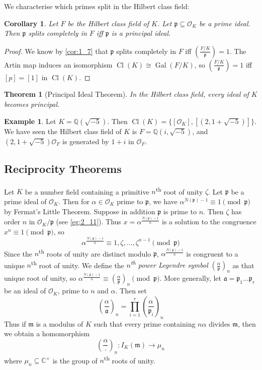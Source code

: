 \documentclass[11pt]{article}
\theoremstyle{definition}
\newtheorem{example}[definition]{Example}
\theoremstyle{plain}
\newtheorem{theorem}[definition]{Theorem}
\newtheorem{corollary}[definition]{Corollary}
\theoremstyle{remark}
\DeclareMathOperator{\Gal}{Gal}
\DeclareMathOperator{\Cl}{Cl}
\newcommand{\QQ}{\mathbb{Q}}
\newcommand{\CC}{\mathbb{C}}
\newcommand{\cO}{\mathcal{O}}
\newcommand{\fa}{\mathfrak{a}}
\newcommand{\fp}{\mathfrak{p}}
\newcommand{\fm}{\mathfrak{m}}
\newcommand{\leg}[2]{\left(\frac{#1}{#2}\right)}
\begin{document}
\noindent We characterise which primes split in the Hilbert class field:

\begin{corollary}\label{cor:4_8}
    Let $F$ be the Hilbert class field of $K$. Let $\fp \subseteq \cO_K$ be a prime ideal. Then $\fp$ splits completely in $F$ iff $\fp$ is a principal ideal.
\end{corollary}
\begin{proof}
    We know by \autoref{cor:1_7} that $\fp$ splits completely in $F$ iff $\leg{F/K}{\fp} = 1$. The Artin map induces an isomorphism $\Cl(K) \cong \Gal(F/K)$, so $\leg{F/K}{\fp} = 1$ iff $[p] = [1]$ in $\Cl(K)$.
\end{proof}

\begin{theorem}[Principal Ideal Theorem]\label{thm:4_9}
    In the Hilbert class field, every ideal of $K$ becomes principal.
\end{theorem}

\begin{example}\label{eg:4_10}
    Let $K = \QQ(\sqrt{-5})$. Then $\Cl(K) = \{[\cO_K], [(2, 1+\sqrt{-5})]\}$. We have seen the Hilbert class field of $K$ is $F = \QQ(i, \sqrt{-5})$, and $(2, 1+\sqrt{-5}) \cO_F$ is generated by $1+i$ in $\cO_F$.
\end{example}

\subsection{Reciprocity Theorems}

Let $K$ be a number field containing a primitive $n$\textsuperscript{th} root of unity $\zeta$. Let $\fp$ be a prime ideal of $\cO_K$. Then for $\alpha \in \cO_K$ prime to $\fp$, we have $\alpha^{N(\fp) - 1} \equiv 1 \pmod{\fp}$ by Fermat's Little Theorem. Suppose in addition $\fp$ is prime to $n$. Then $\zeta$ has order $n$ in $\cO_K / \fp$ (see \autoref{eg:2_11}). Thus $x = \alpha^{\frac{N(\fp)-1}{n}}$ is a solution to the congruence $x^n \equiv 1 \pmod{\fp}$, so
\begin{equation*}
    \alpha^{\frac{N(\fp)-1}{n}} \equiv 1, \zeta, \ldots, \zeta^{n-1} \pmod{\fp}
\end{equation*}
Since the $n$\textsuperscript{th} roots of unity are distinct modulo $\fp$, $\alpha^{\frac{N(\fp)-1}{n}}$ is congruent to a unique $n$\textsuperscript{th} root of unity. We define the \emph{$n$\textsuperscript{th} power Legendre symbol} $\leg{\alpha}{\fp}_n$ as that unique root of unity, so $\alpha^{\frac{N(\fp)-1}{n}} \equiv \leg{\alpha}{\fp}_n \pmod{\fp}$. More generally, let $\fa = \fp_1 \ldots \fp_r$ be an ideal of $\cO_K$, prime to $n$ and $\alpha$. Then set
\begin{equation*}
    \leg{\alpha}{\fa}_n = \prod_{i=1}^r \leg{\alpha}{\fp_i}_n
\end{equation*}
Thus if $\fm$ is a modulus of $K$ such that every prime containing $n\alpha$ divides $\fm$, then we obtain a homomorphism
\begin{equation*}
    \leg{\alpha}{\cdot}_n : I_K(\fm) \to \mu_n
\end{equation*}
where $\mu_n \subseteq \CC^\times$ is the group of $n$\textsuperscript{th} roots of unity.
\end{document}
